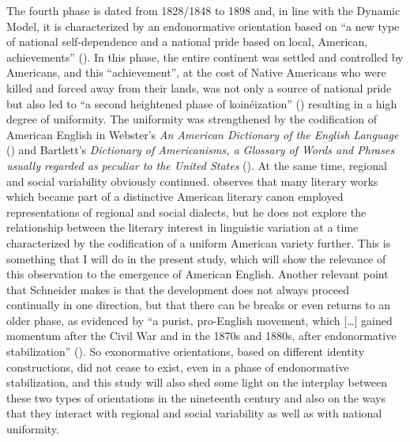 The fourth phase is dated from 1828/1848 to 1898 and, in line with the Dynamic Model, it is characterized by an endonormative orientation based on “a new type of national self-dependence and a national pride based on local, American, achievements” (\citeyear[283]{Schneider2007}). In this phase, the entire continent was settled and controlled by Americans, and this “achievement”, at the cost of Native Americans who were killed and forced away from their lands, was not only a source of national pride but also led to “a second heightened phase of koinéization” (\citeyear[290]{Schneider2007}) resulting in a high degree of uniformity. The uniformity was strengthened by the codification of American English in Webster’s \textit{An American Dictionary of the English Language} (\citeyear{Webster1828}) and Bartlett’s \textit{Dictionary of Americanisms, a Glossary of Words and Phrases usually regarded as peculiar to the United States} (\citeyear{Bartlett1848}). At the same time, regional and social variability obviously continued. \citet[289]{Schneider2007} observes that many literary works which became part of a distinctive American literary canon employed representations of regional and social dialects, but he does not explore the relationship between the literary interest in linguistic variation at a time characterized by the codification of a uniform American variety further. This is something that I will do in the present study, which will show the relevance of this observation to the emergence of American English. Another relevant point that Schneider makes is that the development does not always proceed continually in one direction, but that there can be breaks or even returns to an older phase, as evidenced by “a purist, pro-English movement, which […] gained momentum after the Civil War and in the 1870s and 1880s, after endonormative stabilization” (\citeyear[288]{Schneider2007}). So exonormative orientations, based on different identity constructions, did not cease to exist, even in a phase of endonormative stabilization, and this study will also shed some light on the interplay between these two types of orientations in the nineteenth century and also on the ways that they interact with regional and social variability as well as with national uniformity.

